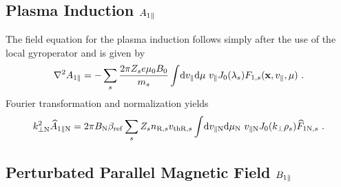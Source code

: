 \subsection*{Plasma Induction $A_{1\parallel}$}
\label{sub:fieldInductionLocal}

The field equation for the plasma induction follows simply after the use of the local gyroperator and is given by
\begin{gather}
	\nabla^2 A_{1\parallel} = - \sum_s \frac{2\pi Z_se \mu_0 B_0}{m_s}  \int \! \mathrm{d}v_\parallel\mathrm{d}\mu ~ v_\parallel J_0(\lambda_s) F_{1,s}(\boldsymbol{\mathbf{x}}, v_\parallel, \mu)~.
	\label{eq:fieldInductionLocal}
\end{gather}
Fourier transformation and normalization yields
\begin{gather}
	k_{\perp \mathrm{N}}^2 \widehat{A}_{1\parallel \mathrm{N}} = 2 \pi B_\mathrm{N} \beta_\mathrm{ref}\sum_s Z_s n_{\mathrm{R},s} v_{\mathrm{th}\mathrm{R},s} \int \! \mathrm{d}v_{\parallel \mathrm{N}}\mathrm{d}\mu_\mathrm{N} ~ v_{\parallel \mathrm{N}} J_0(k_\perp \rho_s) \widehat{F}_{1\mathrm{N},s}~.
	\label{eq:fieldInductionLocalNorm}
\end{gather}

\subsection*{Perturbated Parallel Magnetic Field $B_{1\parallel}$}
\label{sub:fieldMagneticLocal}

